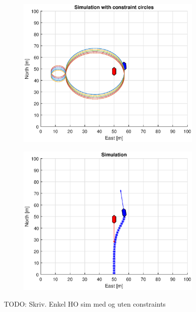 \begin{figure}[!b]
\begin{subfigure}[b]{0.499\textwidth}
    \end{subfigure}
    \hfill
    \\
    \begin{subfigure}[b]{0.49\textwidth}
        \centering
        \includegraphics[width=\textwidth]{Images/Figures/Enkel_HO/Simple0_f1_Frame3}
    \end{subfigure}
    \hfill
    \begin{subfigure}[b]{0.499\textwidth}
        \centering
        \includegraphics[width=\textwidth]{Images/Figures/Enkel_HO/Simple0_f600_Frame3}
    \end{subfigure}
    \hfill
    \caption{TODO: Skriv. Enkel HO sim med og uten constraints}
\end{figure}%


